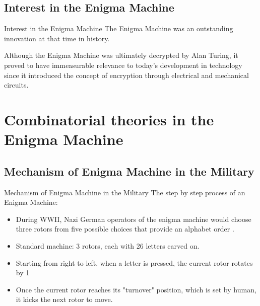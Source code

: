 \documentclass{beamer}
\begin{document}
\subsection{Interest in the Enigma Machine}
\begin{frame}{Interest in the Enigma Machine}
The Enigma Machine was an outstanding innovation at that time in history.
\par Although the Enigma Machine was ultimately decrypted by Alan Turing, it proved to have immeasurable relevance to today’s development in technology since it introduced the concept of encryption through electrical and mechanical circuits.
    
\end{frame}
\section{Combinatorial theories in the Enigma Machine}

\subsection{Mechanism of Enigma Machine in the Military}

\begin{frame}{Mechanism of Enigma Machine in the Military}
The step by step process of an Enigma Machine:
\begin{itemize}
\item During WWII, Nazi German operators of the enigma machine would choose three rotors from five possible choices that provide an alphabet order \cite{MLB}.
\item Standard machine: 3 rotors, each with 26 letters carved on.
\item Starting from right to left, when a letter is pressed, the current rotor rotates by 1
\item Once the current rotor reaches its "turnover" position, which is set by human, it kicks the next rotor to move.
\end{itemize}
\end{frame}
\end{document}
